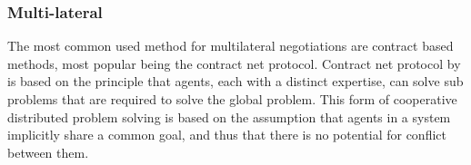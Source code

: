 
\subsubsection{Multi-lateral}
The most common used method for multilateral negotiations are contract based methods, most popular being the contract net protocol. Contract net protocol by \citet{smith1980communication} is based on the principle that agents, each with a distinct expertise, can solve sub problems that are required to solve the global problem. This form of cooperative distributed problem solving is based on the assumption that agents in a system implicitly share a common goal, and thus that there is no potential for conflict between them.

